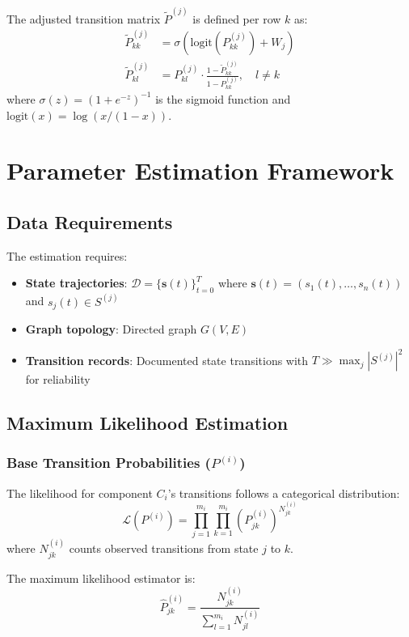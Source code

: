 \documentclass[answers,12pt,addpoints]{exam}
\begin{document}
The adjusted transition matrix $\widetilde{P}^{(j)}$ is defined per row $k$ as:
\begin{align}
    \widetilde{P}^{(j)}_{kk} &= \sigma\left( \mathrm{logit}\left(P^{(j)}_{kk}\right) + W_j \right) \label{eq:diag_adj} \\
    \widetilde{P}^{(j)}_{kl} &= P^{(j)}_{kl} \cdot \frac{1 - \widetilde{P}^{(j)}_{kk}}{1 - P^{(j)}_{kk}}, \quad l \neq k \label{eq:offdiag_adj}
\end{align}
where $\sigma(z) = (1 + e^{-z})^{-1}$ is the sigmoid function and $\mathrm{logit}(x) = \log(x/(1-x))$.

\section{Parameter Estimation Framework}

\subsection{Data Requirements}
The estimation requires:
\begin{itemize}
    \item \textbf{State trajectories}: $\mathscr{D} = \{\mathbf{s}(t)\}_{t=0}^T$ where $\mathbf{s}(t) = (s_1(t), \dots, s_n(t))$ and $s_j(t) \in S^{(j)}$
    \item \textbf{Graph topology}: Directed graph $G(V,E)$
    \item \textbf{Transition records}: Documented state transitions with $T \gg \max_j |S^{(j)}|^2$ for reliability
\end{itemize}

\subsection{Maximum Likelihood Estimation}

\subsubsection{Base Transition Probabilities ($P^{(i)}$)}
The likelihood for component $C_i$'s transitions follows a categorical distribution:
\begin{equation}
    \mathscr{L}(P^{(i)}) = \prod_{j=1}^{m_i} \prod_{k=1}^{m_i} (P^{(i)}_{jk})^{N^{(i)}_{jk}}
\end{equation}
where $N^{(i)}_{jk}$ counts observed transitions from state $j$ to $k$.

\begin{theorem}
The maximum likelihood estimator is:
\begin{equation}
    \hat{P}^{(i)}_{jk} = \frac{N^{(i)}_{jk}}{\sum_{l=1}^{m_i} N^{(i)}_{jl}} \label{eq:mle_base}
\end{equation}
\end{theorem}
\end{document}
